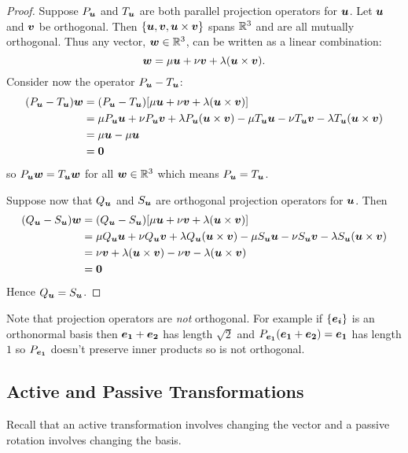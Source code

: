 \begin{proof}
    Suppose \(P_{\bm{u}}\) and \(T_{\bm{u}}\) are both parallel projection operators for \(\bm{u}\).
    Let \(\bm{u}\) and \(\bm{v}\) be orthogonal.
    Then \(\{\bm{u}, \bm{v}, \bm{u}\times\bm{v}\}\) spans \(\mathbb{R}^3\) and are all mutually orthogonal.
    Thus any vector, \(\bm{w}\in\mathbb{R}^3\), can be written as a linear combination:
    \[\bm{w} = \mu\bm{u} + \nu\bm{v} + \lambda(\bm{u}\times\bm{v}).\]
    Consider now the operator \(P_{\bm{u}} - T_{\bm{u}}\):
    \begin{align*}
        (P_{\bm{u}} - T_{\bm{u}})\bm{w} &= (P_{\bm{u}} - T_{\bm{u}}) [\mu\bm{u} + \nu\bm{v} + \lambda(\bm{u}\times\bm{v})]\\
        &= \mu P_{\bm{u}}\bm{u} + \nu P_{\bm{u}}\bm{v} + \lambda P_{\bm{u}}(\bm{u}\times\bm{v}) - \mu T_{\bm{u}}\bm{u} - \nu T_{\bm{u}}\bm{v} - \lambda T_{\bm{u}}(\bm{u}\times\bm{v})\\
        &= \mu\bm{u} - \mu\bm{u}\\
        &= \bm{0}
    \end{align*}
    so \(P_{\bm{u}}\bm{w} = T_{\bm{u}}\bm{w}\) for all \(\bm{w}\in\mathbb{R}^3\) which means \(P_{\bm{u}} = T_{\bm{u}}\).
    
    Suppose now that \(Q_{\bm{u}}\) and \(S_{\bm{u}}\) are orthogonal projection operators for \(\bm{u}\).
    Then
    \begin{align*}
        (Q_{\bm{u}} - S_{\bm{u}})\bm{w} &= (Q_{\bm{u}} - S_{\bm{u}}) [\mu\bm{u} + \nu\bm{v} + \lambda(\bm{u}\times\bm{v})]\\
        &= \mu Q_{\bm{u}}\bm{u} + \nu Q_{\bm{u}}\bm{v} + \lambda Q_{\bm{u}}(\bm{u}\times\bm{v}) - \mu S_{\bm{u}}\bm{u} - \nu S_{\bm{u}}\bm{v} - \lambda S_{\bm{u}}(\bm{u}\times\bm{v})\\
        &= \nu\bm{v} + \lambda(\bm{u}\times\bm{v}) - \nu\bm{v} - \lambda(\bm{u}\times\bm{v})\\
        &= \bm{0}
    \end{align*}
    Hence \(Q_{\bm{u}} = S_{\bm{u}}\).
\end{proof}
Note that projection operators are \emph{not} orthogonal.
For example if \(\{\bm{e_{i}}\}\) is an orthonormal basis then \(\bm{e_{1}} + \bm{e_{2}}\) has length \(\sqrt{2}\) and \(P_{\bm{e_{1}}}(\bm{e_{1}} + \bm{e_{2}}) = \bm{e_{1}}\) has length \(1\) so \(P_{\bm{e_{1}}}\) doesn't preserve inner products so is not orthogonal.

\subsection{Active and Passive Transformations}
Recall that an active transformation involves changing the vector and a passive rotation involves changing the basis.

